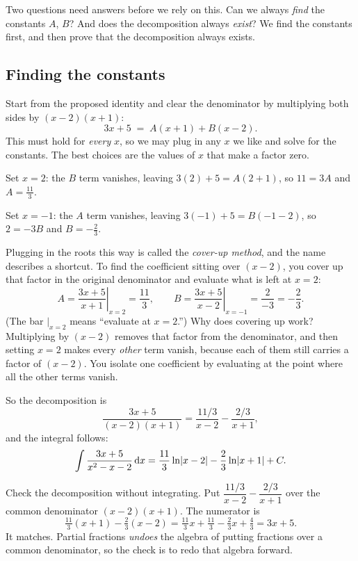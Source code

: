 Two questions need answers before we rely on this. Can we always \emph{find}
the constants $A$, $B$? And does the decomposition always \emph{exist}? We find
the constants first, and then prove that the decomposition always exists.

\subsection{Finding the constants}

Start from the proposed identity and clear the denominator by multiplying both
sides by $(x-2)(x+1)$:
\[
3x + 5 \;=\; A(x+1) + B(x-2).
\]
This must hold for \emph{every} $x$, so we may plug in any $x$ we like and
solve for the constants. The best choices are the values of $x$ that make a
factor zero.

Set $x = 2$: the $B$ term vanishes, leaving $3(2)+5 = A(2+1)$, so $11 = 3A$ and
$A = \tfrac{11}{3}$.

Set $x = -1$: the $A$ term vanishes, leaving $3(-1)+5 = B(-1-2)$, so $2 = -3B$ and
$B = -\tfrac{2}{3}$.

\begin{intuitionbox}
Plugging in the roots this way is called the \emph{cover-up method}, and the
name describes a shortcut. To find the coefficient sitting over
$(x-2)$, you cover up that factor in the original denominator and evaluate
what is left at $x = 2$:
\[
A = \left.\frac{3x+5}{x+1}\right|_{x=2} = \frac{11}{3},
\qquad
B = \left.\frac{3x+5}{x-2}\right|_{x=-1} = \frac{2}{-3} = -\frac{2}{3}.
\]
(The bar $\big|_{x=2}$ means ``evaluate at $x=2$.'') Why does covering up work? Multiplying by $(x-2)$ removes that factor from the
denominator, and then setting $x = 2$ makes every \emph{other} term vanish,
because each of them still carries a factor of $(x-2)$. You isolate one
coefficient by evaluating at the point where all the other terms vanish.
\end{intuitionbox}

So the decomposition is
\[
\frac{3x+5}{(x-2)(x+1)} = \frac{11/3}{x-2} - \frac{2/3}{x+1},
\]
and the integral follows:
\[
\int \frac{3x+5}{x^2-x-2}\,\mathrm{d} x
= \frac{11}{3}\ln\lvert x-2\rvert - \frac{2}{3}\ln\lvert x+1\rvert + C.
\]

\begin{labbox}
Check the decomposition without integrating. Put $\dfrac{11/3}{x-2} -
\dfrac{2/3}{x+1}$ over the common denominator $(x-2)(x+1)$. The numerator is
\[
\tfrac{11}{3}(x+1) - \tfrac{2}{3}(x-2) = \tfrac{11}{3}x + \tfrac{11}{3}
- \tfrac{2}{3}x + \tfrac{4}{3} = 3x + 5.
\]
It matches. Partial fractions \emph{undoes} the algebra of putting fractions
over a common denominator, so the check is to redo that algebra forward.
\end{labbox}

